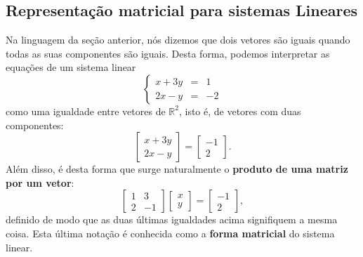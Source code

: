 \documentclass[../livro.tex]{subfiles}  %
\begin{document}
\subsection{Representação matricial para sistemas Lineares}

Na linguagem da seção anterior, nós dizemos que dois vetores são iguais quando todas as suas componentes são iguais. Desta forma, podemos interpretar as equações de um sistema linear
\begin{equation}
  \left\{
    \begin{array}{rcl}
      x+3y&=&1 \\
      2x-y&=&-2
    \end{array}
  \right.
\end{equation} como uma igualdade entre vetores de $\mathbb{R}^2$, isto é, de vetores com duas componentes:
\begin{equation}
  \left[
    \begin{array}{c}
      x+3y \\
      2x-y
    \end{array}
  \right] =
    \left[
    \begin{array}{c}
      -1 \\
      2
    \end{array}
  \right].
\end{equation} Além disso, é desta forma que surge naturalmente o \textbf{produto de uma matriz por um vetor}:
\begin{equation}
  \left[
    \begin{array}{cc}
      1 & 3 \\
      2 & -1
    \end{array}
  \right]
  \left[
    \begin{array}{c}
      x \\
      y
    \end{array}
  \right] =
    \left[
    \begin{array}{c}
      -1 \\
      2
    \end{array}
  \right],
\end{equation} definido de modo que as duas últimas igualdades acima signifiquem a mesma coisa. Esta última notação é conhecida como a \textbf{forma matricial} do sistema linear.
\end{document}
